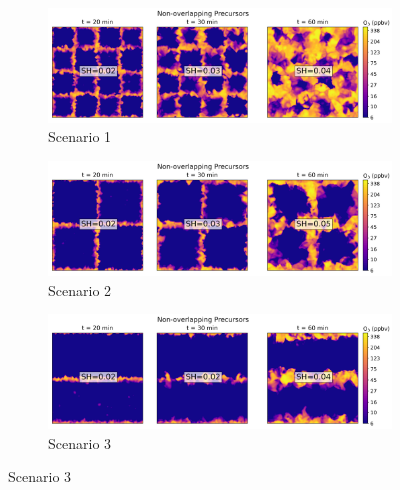 \begin{figure}[h]
  \centering
  \begin{subfigure}
    \centering
    \includegraphics[width=\textwidth]{figures/ozone_cross_section_fx2fy2_overlapFalse.png}
    \caption{Scenario 1}
  \end{subfigure}
     \vspace*{5mm} 
  \begin{subfigure}
    \centering
    \includegraphics[width=\textwidth]{figures/ozone_cross_section_fx1fy1_overlapFalse.png}
    \caption{Scenario 2}
  \end{subfigure}
   \vspace*{5mm} 
  \begin{subfigure}
    \centering
    \includegraphics[width=\textwidth]{figures/ozone_cross_section_fx1fy0_overlapFalse.png}
    \caption{Scenario 3}
  \end{subfigure}
\end{figure}


